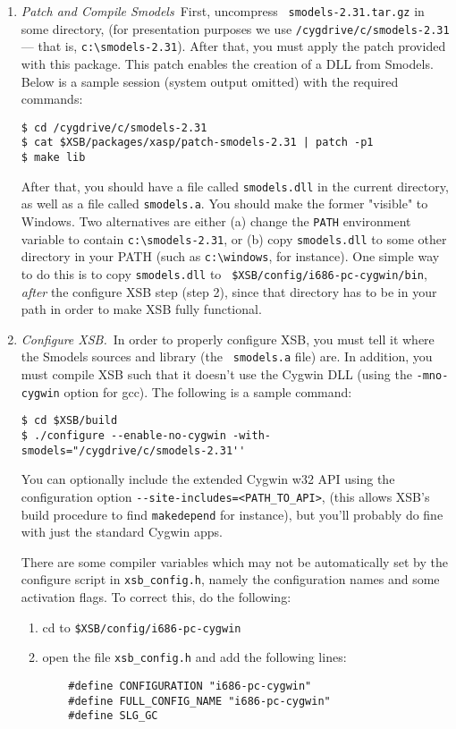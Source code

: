 \begin{enumerate}
\item {\em Patch and Compile Smodels}\ First, uncompress {\tt
  smodels-2.31.tar.gz} in some directory, (for presentation purposes
  we use {\tt /cygdrive/c/smodels-2.31} --- that is,
  \verb|c:\smodels-2.31|). After that, you must apply the patch
  provided with this package. This patch enables the creation of a DLL
  from Smodels. Below is a sample session (system output omitted) with
  the required commands:
%
\begin{verbatim}
$ cd /cygdrive/c/smodels-2.31
$ cat $XSB/packages/xasp/patch-smodels-2.31 | patch -p1
$ make lib
\end{verbatim}
%
After that, you should have a file called {\tt smodels.dll} in the
current directory, as well as a file called {\tt smodels.a}. You
should make the former "visible" to Windows. Two alternatives are
either (a) change the {\tt PATH} environment variable to contain
\verb|c:\smodels-2.31|, or (b) copy {\tt smodels.dll} to some other
directory in your PATH (such as \verb|c:\windows|, for instance).  One
simple way to do this is to copy {\tt smodels.dll} to {\tt
  \$XSB/config/i686-pc-cygwin/bin}, {\em after} the configure XSB step
(step 2), since that directory has to be in your path in order to make
XSB fully functional.

\item{\em Configure XSB.}\ In order to properly configure XSB, you
  must tell it where the Smodels sources and library (the {\tt
    smodels.a} file) are. In addition, you must compile XSB such that
  it doesn't use the Cygwin DLL (using the {\tt -mno-cygwin} option
  for gcc). The following is a sample command:
%
\begin{verbatim}
$ cd $XSB/build
$ ./configure --enable-no-cygwin -with-smodels="/cygdrive/c/smodels-2.31''
\end{verbatim}
%
You can optionally include the extended Cygwin w32 API using the
configuration option \verb|--site-includes=<PATH_TO_API>|, (this
allows XSB's build procedure to find {\tt makedepend} for instance),
but you'll probably do fine with just the standard Cygwin apps.

There are some compiler variables which may not be automatically set
by the configure script in {\tt xsb\_config.h}, namely the
configuration names and some activation flags. To correct this, do the
following:

\begin{enumerate}
\item  cd to {\tt \$XSB/config/i686-pc-cygwin}
\item  open the file {\tt xsb\_config.h} and add the following lines:
\begin{verbatim}
	#define CONFIGURATION "i686-pc-cygwin"
	#define FULL_CONFIG_NAME "i686-pc-cygwin"
	#define SLG_GC
\end{verbatim}
\end{enumerate}


\end{enumerate}
